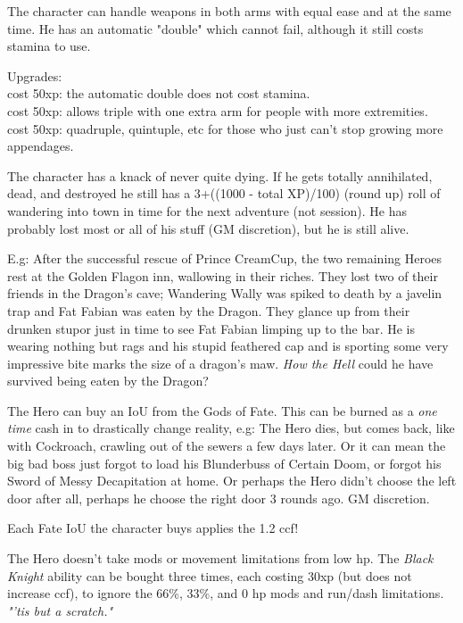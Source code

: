  The character can handle weapons in both arms with equal ease and at the same time. He has an automatic "double" which cannot fail, although it still costs stamina to use.

Upgrades:\\
cost 50xp: the automatic double does not cost stamina. \\
cost 50xp: allows triple with one extra arm for people with more extremities. \\
cost 50xp: quadruple, quintuple, etc for those who just can't stop growing more appendages.


 The character has a knack of never quite dying. If he gets totally annihilated, dead, and destroyed he still has a 3+((1000 - total XP)/100) (round up) roll of wandering into town in time for the next adventure (not session). He has probably lost most or all of his stuff (GM discretion), but he is still alive.

E.g: After the successful rescue of Prince CreamCup, the two remaining Heroes rest at the Golden Flagon inn, wallowing in their riches. They lost two of their friends in the Dragon's cave; Wandering Wally was spiked to death by a javelin trap and Fat Fabian was eaten by the Dragon. They glance up from their drunken stupor just in time to see Fat Fabian limping up to the bar. He is wearing nothing but rags and his stupid feathered cap and is sporting some very impressive bite marks the size of a dragon's maw. \emph{How the Hell} could he have survived being eaten by the Dragon?


 The Hero can buy an IoU from the Gods of Fate. This can be burned as a \emph{one time} cash in to drastically change reality, e.g: The Hero dies, but comes back, like with Cockroach, crawling out of the sewers a few days later. Or it can mean the big bad boss just forgot to load his Blunderbuss of Certain Doom, or forgot his Sword of Messy Decapitation at home. Or perhaps the Hero didn't choose the left door after all, perhaps he choose the right door 3 rounds ago. GM discretion.

Each Fate IoU the character buys applies the 1.2 ccf!


 The Hero doesn't take mods or movement limitations from low hp. The \emph{Black Knight} ability can be bought three times, each costing 30xp (but does not increase ccf), to ignore the 66\%, 33\%, and 0 hp mods and run/dash limitations. \emph{"'tis but a scratch."}


